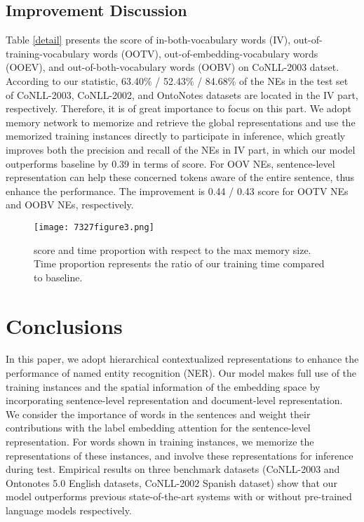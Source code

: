 \documentclass[letterpaper]{article} \usepackage{aaai20}  \usepackage{times}  \usepackage{helvet} \usepackage{courier}  \usepackage[hyphens]{url}  \usepackage{graphicx} \urlstyle{rm} \def\UrlFont{\rm}  \usepackage{graphicx}  \frenchspacing  \setlength{\pdfpagewidth}{8.5in}  \setlength{\pdfpageheight}{11in}
\begin{document}
\subsection{Improvement Discussion}
 Table \ref{detail} presents the  score of in-both-vocabulary words (IV), out-of-training-vocabulary words (OOTV), out-of-embedding-vocabulary words (OOEV), and out-of-both-vocabulary words (OOBV) on CoNLL-2003 datset. According to our statistic, 63.40\% / 52.43\% / 84.68\% of the NEs in the test set of CoNLL-2003, CoNLL-2002, and OntoNotes datasets are located in the IV part, respectively. Therefore, it is of great importance to focus on this part. We adopt memory network to memorize and retrieve the global representations and use the memorized training instances directly to participate in inference, which greatly improves both the precision and recall of the NEs in IV part, in which our model outperforms baseline by 0.39 in terms of  score.
 For OOV NEs, sentence-level representation can help these concerned tokens aware of the entire sentence, thus enhance the performance. The improvement is 0.44 / 0.43  score for OOTV NEs and OOBV NEs, respectively.


\begin{figure}[!t]
  \centering 
  \texttt{[image: 7327figure3.png]}
    \caption{ score and time proportion with respect to the max memory size. Time proportion represents the ratio of our training time compared to baseline. }\label{memorysize}
\end{figure} 

\section{Conclusions} 
In this paper, we adopt hierarchical contextualized representations to enhance the performance of named entity recognition (NER). Our model makes full use of the training instances and the spatial information of the embedding space  by incorporating sentence-level representation and document-level representation.
We consider the importance of words in the sentences and weight their contributions with the label embedding attention for the sentence-level representation. 
For words shown  in training instances, we memorize the  representations of these instances, and involve these representations for inference during test. 
Empirical results on three benchmark datasets (CoNLL-2003  and Ontonotes 5.0 English datasets, CoNLL-2002 Spanish dataset)
show that our model outperforms previous state-of-the-art systems with or without pre-trained language models respectively.




\end{document}
